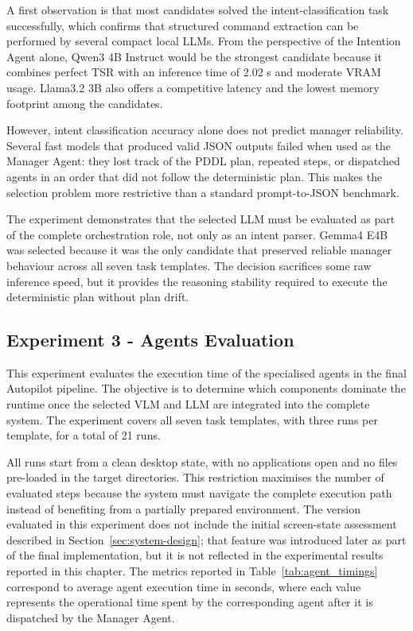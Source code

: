 A first observation is that most candidates solved the intent-classification task successfully, which confirms that structured command extraction can be performed by several compact local LLMs. From the perspective of the Intention Agent alone, Qwen3 4B Instruct would be the strongest candidate because it combines perfect TSR with an inference time of 2.02 s and moderate VRAM usage. Llama3.2 3B also offers a competitive latency and the lowest memory footprint among the candidates.

However, intent classification accuracy alone does not predict manager reliability. Several fast models that produced valid JSON outputs failed when used as the Manager Agent: they lost track of the PDDL plan, repeated steps, or dispatched agents in an order that did not follow the deterministic plan. This makes the selection problem more restrictive than a standard prompt-to-JSON benchmark.

The experiment demonstrates that the selected LLM must be evaluated as part of the complete orchestration role, not only as an intent parser. Gemma4 E4B was selected because it was the only candidate that preserved reliable manager behaviour across all seven task templates. The decision sacrifices some raw inference speed, but it provides the reasoning stability required to execute the deterministic plan without plan drift.

\subsection{Experiment 3 - Agents Evaluation}
\label{sec:autopilot-agents-eval}
This experiment evaluates the execution time of the specialised agents in the final Autopilot pipeline. The objective is to determine which components dominate the runtime once the selected VLM and LLM are integrated into the complete system. The experiment covers all seven task templates, with three runs per template, for a total of 21 runs.

All runs start from a clean desktop state, with no applications open and no files pre-loaded in the target directories. This restriction maximises the number of evaluated steps because the system must navigate the complete execution path instead of benefiting from a partially prepared environment. The version evaluated in this experiment does not include the initial screen-state assessment described in Section~\ref{sec:system-design}; that feature was introduced later as part of the final implementation, but it is not reflected in the experimental results reported in this chapter. The metrics reported in Table~\ref{tab:agent_timings} correspond to average agent execution time in seconds, where each value represents the operational time spent by the corresponding agent after it is dispatched by the Manager Agent.

